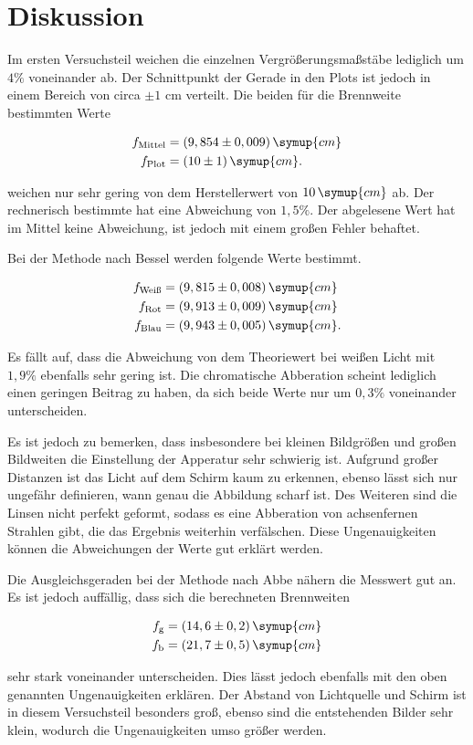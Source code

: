 \section{Diskussion}
\label{sec:Diskussion}

Im ersten Versuchsteil weichen die einzelnen Vergrößerungsmaßstäbe lediglich um $4\%$ voneinander ab.
Der Schnittpunkt der Gerade in den Plots ist jedoch in einem Bereich von circa $\pm 1$ cm verteilt.
Die beiden für die Brennweite bestimmten Werte

\begin{align*}
    f_\text{Mittel} &= (9,854 \pm 0,009) \, \symup{cm}\\
    f_\text{Plot} &= (10 \pm 1) \, \symup{cm}.
\end{align*}

weichen nur sehr gering von dem Herstellerwert von $10 \, \symup{cm}$ ab.
Der rechnerisch bestimmte hat eine Abweichung von $1,5 \%$. Der abgelesene Wert hat im Mittel keine Abweichung, ist jedoch mit einem großen Fehler behaftet.

Bei der Methode nach Bessel werden folgende Werte bestimmt.

\begin{align*}
  f_\text{Weiß} &= (9,815 \pm 0,008) \, \symup{cm}\\
  f_\text{Rot} &=  (9,913 \pm 0,009) \, \symup{cm}\\
  f_\text{Blau} &= (9,943 \pm 0,005) \, \symup{cm}.
\end{align*}

Es fällt auf, dass die Abweichung von dem Theoriewert bei weißen Licht mit $1,9 \%$ ebenfalls sehr gering ist.
Die chromatische Abberation scheint lediglich einen geringen Beitrag zu haben, da sich beide Werte nur um $0,3 \%$ voneinander unterscheiden.

Es ist jedoch zu bemerken, dass insbesondere bei kleinen Bildgrößen und großen Bildweiten die Einstellung der Apperatur sehr schwierig ist.
Aufgrund großer Distanzen ist das Licht auf dem Schirm kaum zu erkennen, ebenso lässt sich nur ungefähr definieren, wann genau die Abbildung scharf ist.
Des Weiteren sind die Linsen nicht perfekt geformt, sodass es eine Abberation von achsenfernen Strahlen gibt, die das Ergebnis weiterhin verfälschen.
Diese Ungenauigkeiten können die Abweichungen der Werte gut erklärt werden.

Die Ausgleichsgeraden bei der Methode nach Abbe nähern die Messwert gut an.
Es ist jedoch auffällig, dass sich die berechneten Brennweiten 

\begin{align*}
  f_\text{g} &= (14,6 \pm 0,2) \, \symup{cm}\\
  f_\text{b} &= (21,7 \pm 0,5) \, \symup{cm}
\end{align*}

sehr stark voneinander unterscheiden. Dies lässt jedoch ebenfalls mit den oben genannten Ungenauigkeiten erklären.
Der Abstand von Lichtquelle und Schirm ist in diesem Versuchsteil besonders groß, ebenso sind die entstehenden Bilder sehr klein, wodurch die Ungenauigkeiten umso größer werden.
